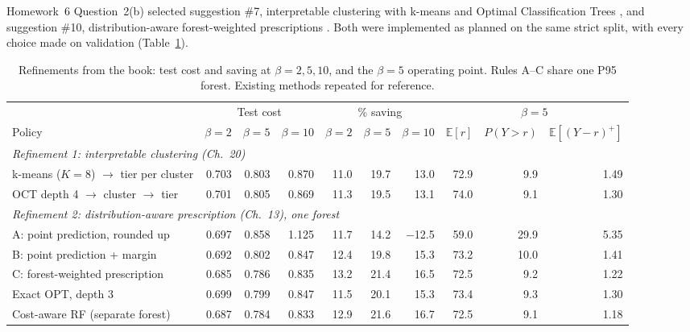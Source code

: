 \documentclass[10pt]{article}
\newcommand{\Ex}{\mathbb{E}}
\begin{document}
Homework~6 Question~2(b) selected suggestion \#7, interpretable clustering with k-means and Optimal Classification Trees \citep[Ch.~20, \S\S20.1--20.2]{bertsimas2019mlopt}, and suggestion \#10, distribution-aware forest-weighted prescriptions \citep[Ch.~13, \S\S13.1--13.2]{bertsimas2019mlopt}. Both were implemented as planned on the same strict split, with every choice made on validation (Table~\ref{tab:refine}).

\begin{table}[t]
\centering\small
\caption{Refinements from the book: test cost and saving at $\beta=2,5,10$, and the $\beta=5$ operating point. Rules A--C share one P95 forest. Existing methods repeated for reference.}
\label{tab:refine}
\setlength{\tabcolsep}{3.6pt}
\begin{tabular}{lrrr|rrr|rrr}
\toprule
 & \multicolumn{3}{c|}{Test cost} & \multicolumn{3}{c|}{\% saving} & \multicolumn{3}{c}{$\beta=5$} \\
Policy & $\beta{=}2$ & $\beta{=}5$ & $\beta{=}10$ & $\beta{=}2$ & $\beta{=}5$ & $\beta{=}10$ & $\Ex[r]$ & $P(Y{>}r)$ & $\Ex[(Y{-}r)^+]$ \\
\midrule
\multicolumn{10}{l}{\emph{Refinement 1: interpretable clustering (Ch.~20)}} \\
k-means ($K=8$) $\to$ tier per cluster & 0.703 & 0.803 & 0.870 & 11.0 & 19.7 & 13.0 & 72.9 & 9.9 & 1.49 \\
OCT depth 4 $\to$ cluster $\to$ tier & 0.701 & 0.805 & 0.869 & 11.3 & 19.5 & 13.1 & 74.0 & 9.1 & 1.30 \\
\multicolumn{10}{l}{\emph{Refinement 2: distribution-aware prescription (Ch.~13), one forest}} \\
A: point prediction, rounded up & 0.697 & 0.858 & 1.125 & 11.7 & 14.2 & $-$12.5 & 59.0 & 29.9 & 5.35 \\
B: point prediction + margin & 0.692 & 0.802 & 0.847 & 12.4 & 19.8 & 15.3 & 73.2 & 10.0 & 1.41 \\
C: forest-weighted prescription & 0.685 & 0.786 & 0.835 & 13.2 & 21.4 & 16.5 & 72.5 & 9.2 & 1.22 \\
\midrule
Exact OPT, depth 3 & 0.699 & 0.799 & 0.847 & 11.5 & 20.1 & 15.3 & 73.4 & 9.3 & 1.30 \\
Cost-aware RF (separate forest) & 0.687 & 0.784 & 0.833 & 12.9 & 21.6 & 16.7 & 72.5 & 9.1 & 1.18 \\
\bottomrule
\end{tabular}
\vspace{-0.5em}
\end{table}
\end{document}
